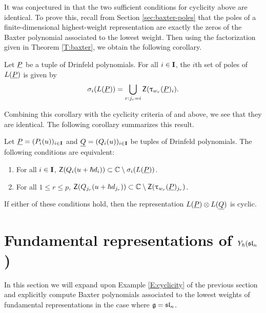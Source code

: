 It was conjectured in \cite[\S 7.5]{gautam_poles_2023} that the two sufficient conditions for cyclicity above are identical.
To prove this, recall from Section \ref{sec:baxter-poles} that the poles of a finite-dimensional highest-weight representation are exactly the zeros of the Baxter polynomial associated to the lowest weight.
Then using the factorization given in Theorem \ref{T:baxter}, we obtain the following corollary.

\begin{corollary}\label{C:baxter-poles}
    Let $\underline{P}$ be a tuple of Drinfeld polynomials.
    For all $i\in\mathbf{I}$, the $i$th set of poles of $L(\underline{P})$ is given by
    \[\sigma_i(L(\underline{P})) = \bigcup_{r:j_r=i}\mathsf{Z}(\uptau_{w_r}(\underline{P})_i).\]
\end{corollary}

Combining this corollary with the cyclicity criteria of \cite{gautam_poles_2023} and \cite{tan_braid_2015} above, we see that they are identical.
The following corollary summarizes this result.

\begin{corollary}\label{C:cyclicity}
    Let $\underline{P} = (P_i(u))_{i\in\mathbf{I}}$ and $\underline{Q} = (Q_i(u))_{i\in\mathbf{I}}$ be tuples of Drinfeld polynomials.
    The following conditions are equivalent:
    \begin{enumerate}
        \item For all $i\in\mathbf{I}$, $\mathsf{Z}(Q_i(u+\hbar d_i))\subset\mathbb{C}\setminus\sigma_i(L(\underline{P}))$.
        \item For all $1\leq r\leq p$, $\mathsf{Z}(Q_{j_r}(u+\hbar d_{j_r}))\subset\mathbb{C}\setminus\mathsf{Z}(\uptau_{w_r}(\underline{P})_{j_r})$.
    \end{enumerate}
    If either of these conditions hold, then the representation $L(\underline{P})\otimes L(\underline{Q})$ is cyclic.
\end{corollary}


\section{Fundamental representations of \texorpdfstring{$Y_\hbar(\mathfrak{sl}_n$)}{Y(sln)}}

In this section we will expand upon Example \ref{E:cyclicity} of the previous section and explicitly compute Baxter polynomials associated to the lowest weights of fundamental representations in the case where $\mathfrak{g}=\mathfrak{sl}_n$.

